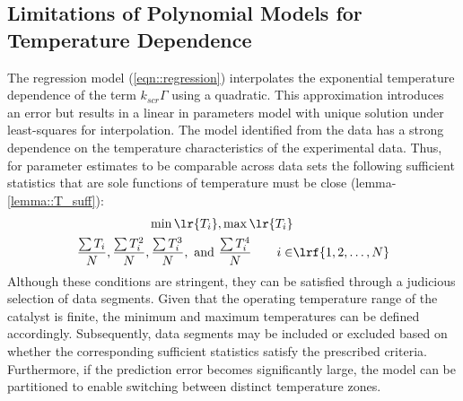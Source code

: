 \subsection{Limitations of Polynomial Models for Temperature Dependence}

The regression model (\ref{eqn::regression}) interpolates the exponential temperature dependence of the term
$k_{scr}\Gamma$ using a quadratic. This approximation introduces an error but results in a linear in parameters model
with unique solution under least-squares for interpolation. The model identified from the data has a strong dependence
on the temperature characteristics of the experimental data. Thus, for parameter estimates to be comparable across data
sets the following sufficient statistics that are sole functions of temperature must be close (lemma-\ref{lemma::T_suff}):
\begin{align}
        \min{\lr{T_i}},  \max{\lr{T_i}} &       \label{eqn::T_suff_1}\\
        \frac{\sum T_i}{N}, \frac{\sum{T_i^2}}{N}, \frac{\sum{T_i^3}}{N}, \text{ and } \frac{\sum{T_i^4}}{N} \qquad i \in & \lrf{1, 2, \hdots, N}       \label{eqn::T_suff_2}
\end{align}
Although these conditions are stringent, they can be satisfied through a judicious selection of data segments. Given
that the operating temperature range of the catalyst is finite, the minimum and maximum temperatures can be defined
accordingly. Subsequently, data segments may be included or excluded based on whether the corresponding sufficient
statistics satisfy the prescribed criteria. Furthermore, if the prediction error becomes significantly large, the model can be partitioned to enable switching between distinct temperature zones.
